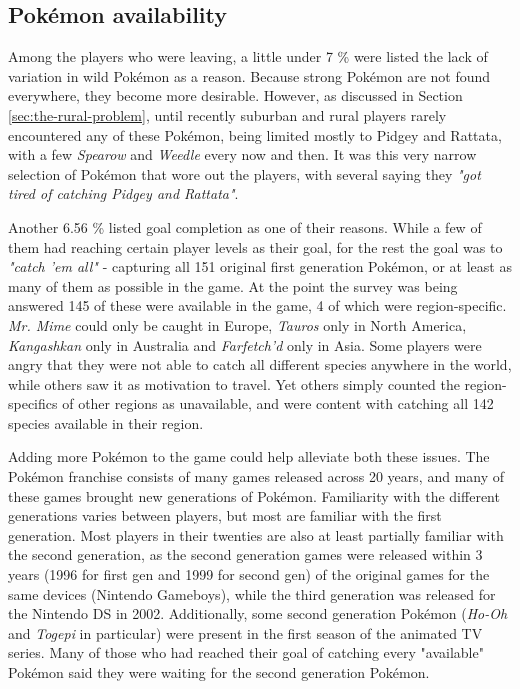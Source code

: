 \subsection{Pokémon availability}
\label{sec:pokemon-availability-and-goal-completion}
Among the players who were leaving, a little under 7 \% were listed the lack of variation in wild Pokémon as a reason. Because strong Pokémon are not found everywhere, they become more desirable. However, as discussed in Section \ref{sec:the-rural-problem}, until recently suburban and rural players rarely encountered any of these Pokémon, being limited mostly to Pidgey and Rattata, with a few \emph{Spearow} and \emph{Weedle} every now and then. It was this very narrow selection of Pokémon that wore out the players, with several saying they \emph{"got tired of catching Pidgey and Rattata"}.

Another 6.56 \% listed goal completion as one of their reasons. While a few of them had reaching certain player levels as their goal, for the rest the goal was to \emph{"catch 'em all"} - capturing all 151 original first generation Pokémon, or at least as many of them as possible in the game. At the point the survey was being answered 145 of these were available in the game, 4 of which were region-specific. \emph{Mr. Mime} could only be caught in Europe, \emph{Tauros} only in North America, \emph{Kangashkan} only in Australia and \emph{Farfetch'd} only in Asia. Some players were angry that they were not able to catch all different species anywhere in the world, while others saw it as motivation to travel. Yet others simply counted the region-specifics of other regions as unavailable, and were content with catching all 142 species available in their region.

Adding more Pokémon to the game could help alleviate both these issues. The Pokémon franchise consists of many games released across 20 years, and many of these games brought new generations of Pokémon. Familiarity with the different generations varies between players, but most are familiar with the first generation. Most players in their twenties are also at least partially familiar with the second generation, as the second generation games were released within 3 years (1996 for first gen and 1999 for second gen) of the original games for the same devices (Nintendo Gameboys), while the third generation was released for the Nintendo DS in 2002. Additionally, some second generation Pokémon (\emph{Ho-Oh} and \emph{Togepi} in particular) were present in the first season of the animated TV series. Many of those who had reached their goal of catching every "available" Pokémon said they were waiting for the second generation Pokémon.

